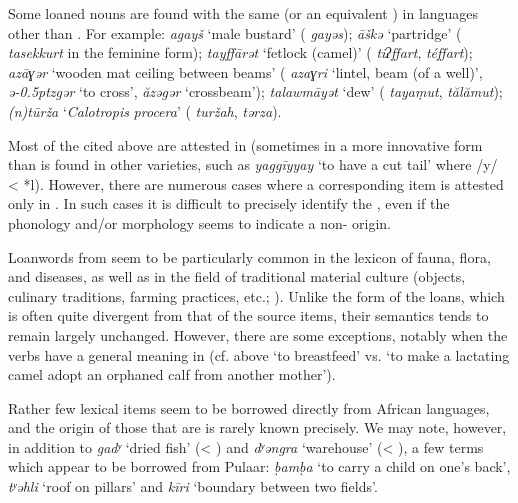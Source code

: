 \documentclass[output=paper]{langsci/langscibook}
\begin{document}
Some loaned  nouns are found with the same  (or an equivalent ) in  languages other than . For example: \textit{agayš} ‘male bustard’ ( \textit{gayəs}); \textit{āškə{\R}} ‘partridge’ ( \textit{tasekkurt} in the feminine form); \textit{tayffārət} ‘fetlock (camel)’ ( \textit{tiʔffart},  \textit{téffart}); \textit{azāɣər} ‘wooden mat ceiling between beams’ ( \textit{azaɣri} ‘lintel, beam (of a well)’,  \textit{ǝ\kern -0.5ptzgər} ‘to cross’, \textit{ăzəgər} ‘crossbeam’); \textit{talawmāyət} ‘dew’ ( \textit{tayaṃut},  \textit{tălămut}); \textit{(n)tūrža} ‘\textit{Calotropis} \textit{procera}’ ( \textit{turžah},  \textit{tərza}).

Most of the  cited above are attested in  (sometimes in a more innovative form than is found in other  varieties, such as \textit{yaggīyyay} ‘to have a cut tail’ where /y/ < *l). However, there are numerous cases where a corresponding  item is attested only in . In such cases it is difficult to precisely identify the , even if the phonology and/or morphology seems to indicate a non- origin. 

Loanwords from  seem to be particularly common in the lexicon of fauna, flora, and diseases, as well as in the field of traditional material culture (objects, culinary traditions, farming practices, etc.; \citealt{Taine-Cheikh2010lexiques,Taine-Cheikh2014}). Unlike the form of the loans, which is often quite divergent from that of the source items, their semantics tends to remain largely unchanged. However, there are some exceptions, notably when the verbs have a general meaning in  (cf. above `to breastfeed' vs. `to make a lactating camel adopt an orphaned calf from another mother'). 


Rather few  lexical items seem to be borrowed directly from African languages, and the origin of those that are is rarely known precisely. We may note, however, in addition to \textit{gadʸ} ‘dried fish’ (< ) and \textit{dʸəngra} ‘warehouse’ (< ), a few terms which appear to be borrowed from Pulaar: \textit{ḅamḅa} ‘to carry a child on one’s back’, \textit{tʸəhli} ‘roof on pillars’ and \textit{kīri} ‘boundary between two fields’.
\end{document}
